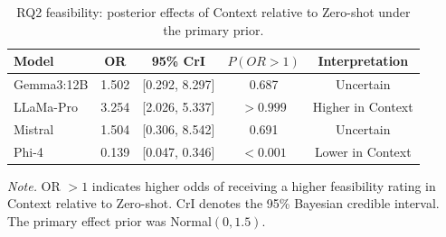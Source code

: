 \begin{table}[tbp]
\caption{RQ2 feasibility: posterior effects of Context relative to Zero-shot under the primary prior.}
\label{tab:rq2_feasibility_bayesian}
\begin{tabular}{lcccc}
\toprule
Model & OR & 95\% CrI & $P(OR>1)$ & Interpretation \\
\midrule
Gemma3:12B & 1.502 & [0.292, 8.297] & 0.687 & Uncertain \\
LLaMa-Pro & 3.254 & [2.026, 5.337] & $>0.999$ & Higher in Context \\
Mistral & 1.504 & [0.306, 8.542] & 0.691 & Uncertain \\
Phi-4 & 0.139 & [0.047, 0.346] & $<0.001$ & Lower in Context \\
\bottomrule
\end{tabular}
\vspace{2pt}
\begin{minipage}{\linewidth}
\footnotesize\textit{Note.} OR $>1$ indicates higher odds of receiving a higher feasibility rating in Context relative to Zero-shot. CrI denotes the 95\% Bayesian credible interval. The primary effect prior was Normal$(0,1.5)$.
\end{minipage}
\end{table}
